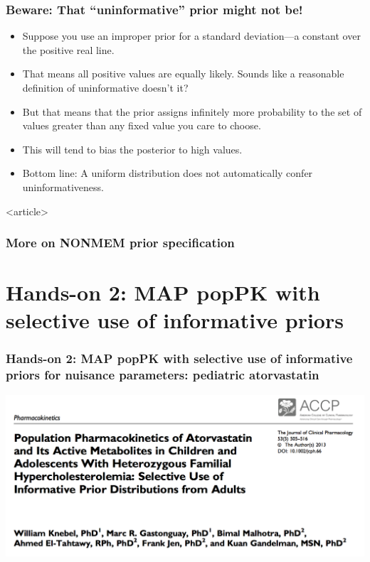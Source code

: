 \documentclass{beamer}
\begin{document}
\begin{frame}
\frametitle{Beware: That ``uninformative'' prior might not be!}

\begin{itemize}
\item Suppose you use an improper prior for a standard deviation---a
  constant over the positive real line.
\item That means all positive values are equally likely. Sounds like a
  reasonable definition of uninformative doesn't it?
\item But that means that the prior assigns infinitely more
  probability to the set of values greater than any fixed value you care to
  choose.
\item This will tend to bias the posterior to high values.
\item Bottom line: A uniform distribution does not automatically
  confer uninformativeness.
\end{itemize}

\end{frame}

\begin{frame}<article>
  \frametitle{More on NONMEM prior specification}
  


\end{frame}

\section{Hands-on 2: MAP popPK with selective use of informative priors}

\begin{frame}
  \frametitle{Hands-on 2: MAP popPK with selective use of informative
    priors for nuisance parameters: pediatric atorvastatin}

\begin{center}
\includegraphics[width=\textwidth]{graphics/KnebelTitle.png}
\end{center}  

\end{frame}
\end{document}
